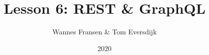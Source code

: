 \documentclass{beamer}
\title{Lesson 6: REST \& GraphQL}
\author{Wannes Fransen \& Tom Eversdijk}
\institute{UC Leuven}
\date{2020}
\begin{document}
\frame{\titlepage}





\end{document}
